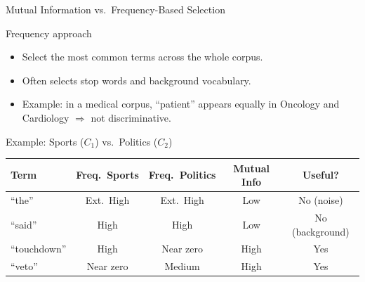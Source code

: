 \begin{frame}{Mutual Information vs.\ Frequency-Based Selection}
  \begin{block}{Frequency approach}
    \begin{itemize}
      \item Select the most common terms across the whole corpus.
      \item Often selects stop words and background vocabulary.
      \item Example: in a medical corpus, ``patient'' appears equally in Oncology and Cardiology
            $\Rightarrow$ not discriminative.
    \end{itemize}
  \end{block}

  \begin{exampleblock}{Example: Sports ($C_1$) vs.\ Politics ($C_2$)}
    \small
    \begin{tabular}{lcccc}
      \toprule
      \textbf{Term} & \textbf{Freq.\ Sports} & \textbf{Freq.\ Politics}
                    & \textbf{Mutual Info} & \textbf{Useful?}\\
      \midrule
      ``the'' & Ext.\ High & Ext.\ High & Low & No (noise)\\
      ``said'' & High & High & Low & No (background)\\
      ``touchdown'' & High & Near zero & \alert{High} & Yes\\
      ``veto'' & Near zero & Medium & \alert{High} & Yes\\
      \bottomrule
    \end{tabular}
  \end{exampleblock}
\end{frame}


